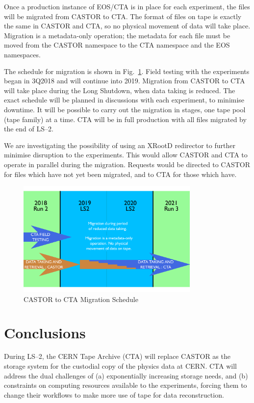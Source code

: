 \documentclass{webofc}
\begin{document}
Once a production instance of EOS/CTA is in place for each experiment, the files will be migrated from CASTOR to CTA.
The format of files on tape is exactly the same in CASTOR and CTA, so no physical movement of data will take place.
Migration is a metadata-only operation; the metadata for each file must be moved from the CASTOR namespace to the CTA
namespace and the EOS namespaces.

The schedule for migration is shown in Fig.~\ref{fig:migration}. Field testing with the experiments began in 3Q2018 and will
continue into 2019. Migration from CASTOR to CTA will take place during the Long Shutdown, when data taking is reduced. The
exact schedule will be planned in discussions with each experiment, to minimise downtime. It will be possible to carry out the
migration in stages, one tape pool (tape family) at a time. CTA will be in full production with all files migrated by the end
of LS--2.

We are investigating the possibility of using an XRootD redirector to further minimise disruption to the experiments. This
would allow CASTOR and CTA to operate in parallel during the migration. Requests would be directed to CASTOR for files which
have not yet been migrated, and to CTA for those which have.

\begin{figure}[t]
   \vspace{-1cm}
   \centering
   \includegraphics[width=0.8\textwidth]{images/Migration}
   \caption{CASTOR to CTA Migration Schedule}
   \label{fig:migration}
\end{figure}

\section{Conclusions}
\label{Conclusions}

During LS--2, the CERN Tape Archive (CTA) will replace CASTOR as the storage system for the custodial
copy of the physics data at CERN. CTA will address the dual challenges of (a) exponentially increasing
storage needs, and (b) constraints on computing resources available to the experiments, forcing them
to change their workflows to make more use of tape for data reconstruction.
\end{document}
